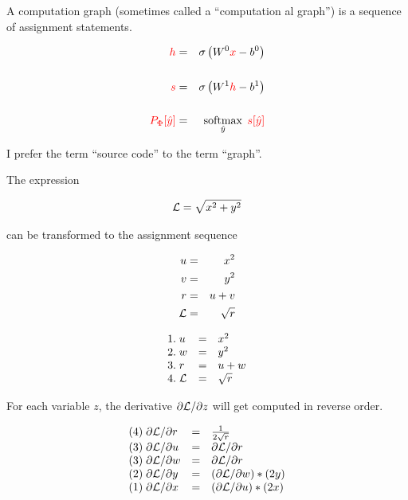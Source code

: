 {

A computation graph (sometimes called a ``computation{\color{red} al} graph'') is a sequence of assignment statements.


\begin{eqnarray*}
  {\color{red} h} & = & \sigma\left(W^0{\color{red} x} - b^0\right) \\
  \\
  {\color{red} s} & = & \sigma\left(W^1{\color{red} h} - b^1 \right) \\
  \\
  {\color{red} P_\Phi[\hat{y}]} & = & \operatorname*{softmax}_{\hat{y}}\;{\color{red} s[\hat{y}]}
\end{eqnarray*}

\vfill
I prefer the term ``source code'' to the term ``graph''.


The expression

\vfill
{\color{red} $${\cal L} = \sqrt{x^2 + y^2}$$}

\vfill
can be transformed to the assignment sequence

{\color{red}
\vfill
\begin{eqnarray*}
  u & = & x^2  \\
  v & = & y^2 \\
  r & =& u + v \\
  {\cal L} & = & \sqrt{r}
\end{eqnarray*}
}

\vspace{-1ex}
{\color{red}
$$\begin{array}{lcl}
 1.\;u & = & x^2  \\
 2.\;w & = & y^2 \\
 3.\;r & =& u + w \\
  4.\;{\cal L} & = & \sqrt{r}
\end{array}$$
}

\vfill
For each variable $z$, the derivative $\partial {\cal L}/\partial z$ will get computed in reverse order.

\vfill
{\color{red}
$$\begin{array}{lcl}
(4)\; \partial{\cal L}/\partial r & = & \frac{1}{2\sqrt{r}} \\
(3)\; \partial{\cal L}/\partial u & = & \partial {\cal L}/\partial r \\
(3)\; \partial{\cal L}/\partial w & = & \partial {\cal L}/\partial r\\
(2)\; \partial{\cal L}/\partial y & = & (\partial {\cal L}/\partial w) * (2y) \\
(1)\; \partial{\cal L}/\partial x & = & (\partial {\cal L}/\partial u) * (2x)
\end{array}$$
}

}
